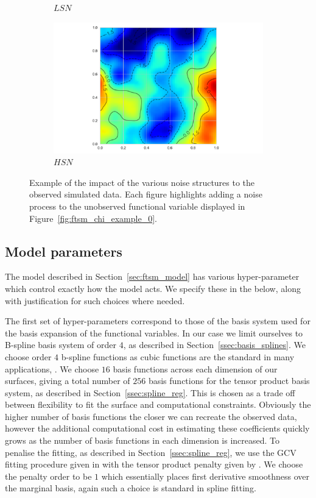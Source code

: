 \begin{figure}
\begin{subfigure}[b]{0.45\textwidth}
		\caption{$LSN$}
	\end{subfigure}
	\begin{subfigure}[b]{0.45\textwidth}
		\includegraphics[width=\textwidth]{sim_noise_example_hsn}
		\caption{$HSN$}
	\end{subfigure}  
	\caption{Example of the impact of the various noise structures to the observed simulated data. Each figure highlights adding a noise process to the unobserved functional variable displayed in Figure~\ref{fig:ftsm_chi_example_0}.}
	\label{fig:ftsm_noise_example}
\end{figure}

\subsection{Model parameters \label{ssec:sim_params}}
The model described in Section~\ref{sec:ftsm_model} has various hyper-parameter which control exactly how the model acts.
We specify these in the below, along with justification for such choices where needed.

The first set of hyper-parameters correspond to those of the basis system used for the basis expansion of the functional variables.
In our case we limit ourselves to B-spline basis system of order $4$, as described in Section~\ref{ssec:basis_splines}.
We choose order $4$ b-spline functions as cubic functions are the standard in many applications, \citep{de_boor_practical_2001}. 
We choose $16$ basis functions across each dimension of our surfaces, giving a total number of $256$ basis functions for the tensor product basis system, as described in Section~\ref{ssec:spline_reg}. 
This is chosen as a trade off between flexibility to fit the surface and computational constraints. 
Obviously the higher number of basis functions the closer we can recreate the observed data, however the additional computational cost in estimating these coefficients quickly grows as the number of basis functions in each dimension is increased.
To penalise the fitting, as described in Section~\ref{ssec:spline_reg}, we use the GCV fitting procedure given in \citep{wahba_spline_1990} with the tensor product penalty given by \citep{wood_p-splines_2017}.
We choose the penalty order to be $1$ which essentially places first derivative smoothness over the marginal basis, again such a choice is standard in spline fitting. 


